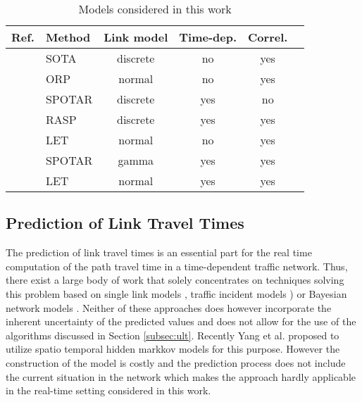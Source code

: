\begin{table}
    \centering
  \begin{tabular}{| l || l | c | c | c | c|}
    \hline
    Ref. & Method & Link model & Time-dep. & Correl. \\
    \hline    \hline
\cite{Nie06} & SOTA & discrete  & no & yes\\ \hline
\cite{Seshadri10} & ORP & normal & no & yes\\ \hline
\cite{Nie09b} & SPOTAR & discrete & yes & no\\ \hline
\cite{Nie09a} & RASP & discrete & yes & yes\\ \hline
\cite{Bi-Yu13} & LET & normal & no & yes\\ \hline
\cite{Zockaei13} & SPOTAR & gamma & yes & yes\\ \hline
\cite{Dong12} & LET & normal & yes & yes\\ \hline
  \end{tabular}
  \caption{Models considered in this work}
  \label{tab:methods}
  \end{table}


\subsection{Prediction of Link Travel Times}
The prediction of link travel times is an essential part for the
real time computation of the path travel time in a time-dependent
traffic network. Thus, there exist a large body of work that solely
concentrates on techniques solving this problem based on
single link models \cite{Pan12}, traffic incident models
\cite{Pan13}) or Bayesian network models \cite{Sun06}. Neither
of these approaches does however incorporate the inherent uncertainty of the
predicted values and does not allow for the use of the algorithms discussed in
Section \ref{subsec:ult}. Recently Yang et al.\cite{Yang13} proposed to
utilize spatio temporal hidden markkov models for this purpose. However the
construction of the model is costly and the prediction
process does not include the current situation in the network which makes the approach hardly
applicable in the real-time setting considered in this work.
